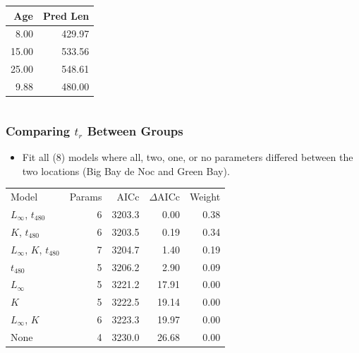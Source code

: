 \documentclass[xcolor=dvipsnames,t]{beamer}\usepackage[]{graphicx}\usepackage[]{color}
\begin{document}
\begin{frame}[fragile]
\begin{columns}
\begin{column}{0.5\textwidth}
\smallskip
\begin{table}[ht]
\centering
\begin{tabular}{rr}
  \hline
Age & Pred Len \\ 
  \hline
8.00 & 429.97 \\ 
  15.00 & 533.56 \\ 
  25.00 & 548.61 \\ 
  9.88 & 480.00 \\ 
   \hline
\end{tabular}
\end{table}

\end{column}
\end{columns}
\end{frame}




\begin{frame}[fragile]
\frametitle{Comparing $t_{r}$ Between Groups}
\begin{itemize}
  \item Fit all (8) models where all, two, one, or no parameters differed between the two locations (Big Bay de Noc and Green Bay).
\end{itemize}
\pause
\bigskip
\begin{table}[ht]
\centering
\begin{tabular}{lrrrr}
  \hline
Model & Params & AICc & $\Delta$AICc & Weight \\ 
  \rowcolor{light-gray} \hline
$L_{\infty}$, $t_{480}$ & 6 & 3203.3 & 0.00 & 0.38 \\ 
   \rowcolor{light-gray}$K$, $t_{480}$ & 6 & 3203.5 & 0.19 & 0.34 \\ 
   \rowcolor{light-gray}$L_{\infty}$, $K$, $t_{480}$ & 7 & 3204.7 & 1.40 & 0.19 \\ 
   \rowcolor{light-gray}$t_{480}$ & 5 & 3206.2 & 2.90 & 0.09 \\ 
  $L_{\infty}$ & 5 & 3221.2 & 17.91 & 0.00 \\ 
  $K$ & 5 & 3222.5 & 19.14 & 0.00 \\ 
  $L_{\infty}$, $K$ & 6 & 3223.3 & 19.97 & 0.00 \\ 
  None & 4 & 3230.0 & 26.68 & 0.00 \\ 
   \hline
\end{tabular}
\end{table}

\end{frame}
\end{document}
